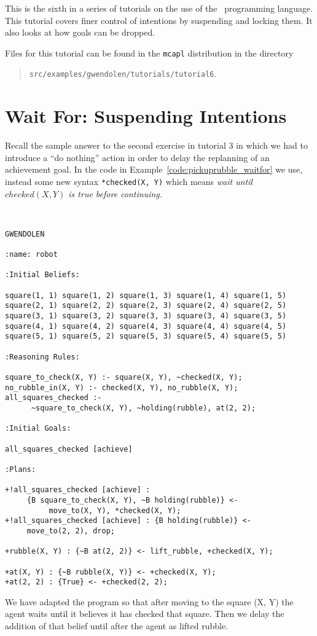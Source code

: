 
This is the sixth in a series of tutorials on the use of the \gwendolen\ programming language.  This tutorial covers finer control of intentions by suspending and locking them.  It also looks at how goals can be dropped.

Files for this tutorial can be found in the \texttt{mcapl} distribution in the directory 
\begin{quote}
\texttt{src/examples/gwendolen/tutorials/tutorial6}.
\end{quote}

\section{Wait For: Suspending Intentions}

Recall the sample answer to the second exercise in tutorial 3 in which we had to introduce a ``do nothing'' action in order to delay the replanning of an achievement goal.  In the code in Example~\ref{code:pickuprubble_waitfor} we use, instead some new syntax \lstinline{*checked(X, Y)} which means \emph{wait until $checked(X, Y)$ is true before continuing.}

\begin{ourexample}
\label{code:pickuprubble_waitfor} \quad \\
\begin{lstlisting}[basicstyle=\sffamily,style=easslisting,language=Gwendolen]
GWENDOLEN

:name: robot

:Initial Beliefs:

square(1, 1) square(1, 2) square(1, 3) square(1, 4) square(1, 5)
square(2, 1) square(2, 2) square(2, 3) square(2, 4) square(2, 5)
square(3, 1) square(3, 2) square(3, 3) square(3, 4) square(3, 5)
square(4, 1) square(4, 2) square(4, 3) square(4, 4) square(4, 5)
square(5, 1) square(5, 2) square(5, 3) square(5, 4) square(5, 5)

:Reasoning Rules:

square_to_check(X, Y) :- square(X, Y), ~checked(X, Y);
no_rubble_in(X, Y) :- checked(X, Y), no_rubble(X, Y);
all_squares_checked :-
      ~square_to_check(X, Y), ~holding(rubble), at(2, 2);

:Initial Goals:

all_squares_checked [achieve]

:Plans:

+!all_squares_checked [achieve] : 
     {B square_to_check(X, Y), ~B holding(rubble)} <- 
          move_to(X, Y), *checked(X, Y);
+!all_squares_checked [achieve] : {B holding(rubble)} <- 
     move_to(2, 2), drop;

+rubble(X, Y) : {~B at(2, 2)} <- lift_rubble, +checked(X, Y);

+at(X, Y) : {~B rubble(X, Y)} <- +checked(X, Y);
+at(2, 2) : {True} <- +checked(2, 2);
\end{lstlisting}
\end{ourexample}
We have adapted the program so that after moving to the square (X, Y) the agent waits until it believes it has checked that square.  Then we delay the addition of that belief until after the agent as lifted rubble.

